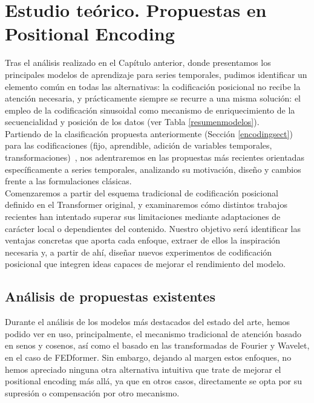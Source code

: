 \chapter{Estudio teórico. Propuestas en Positional Encoding}
\label{codificacionescap}

Tras el análisis realizado en el Capítulo anterior, donde presentamos los principales modelos de aprendizaje para series temporales, pudimos identificar un elemento común en todas las alternativas: la codificación posicional no recibe la atención necesaria, y prácticamente siempre se recurre a una misma solución: el empleo de la codificación sinusoidal como mecanismo de enriquecimiento de la secuencialidad y posición de los datos (ver Tabla \ref{resumenmodelos}).\\

Partiendo de la clasificación propuesta anteriormente (Sección \ref{encodingsect}) para las codificaciones (fijo, aprendible, adición de variables temporales, transformaciones)~\cite{irani2025positionalencodingtransformerbasedtime}, nos adentraremos en las propuestas más recientes orientadas específicamente a series temporales, analizando su motivación, diseño y cambios frente a las formulaciones clásicas.\\

Comenzaremos a partir del esquema tradicional de codificación posicional definido en el Transformer original, y examinaremos cómo distintos trabajos recientes han intentado superar sus limitaciones mediante adaptaciones de carácter local o dependientes del contenido. Nuestro objetivo será identificar las ventajas concretas que aporta cada enfoque, extraer de ellos la inspiración necesaria y, a partir de ahí, diseñar nuevos experimentos de codificación posicional que integren ideas capaces de mejorar el rendimiento del modelo.

\section{Análisis de propuestas existentes}

Durante el análisis de los modelos más destacados del estado del arte, hemos podido ver en uso, principalmente, el mecanismo tradicional de atención basado en senos y cosenos, así como el basado en las transformadas de Fourier y Wavelet, en el caso de FEDformer. Sin embargo, dejando al margen estos enfoques, no hemos apreciado ninguna otra alternativa intuitiva que trate de mejorar el positional encoding más allá, ya que en otros casos, directamente se opta por su supresión o compensación por otro mecanismo.\\


